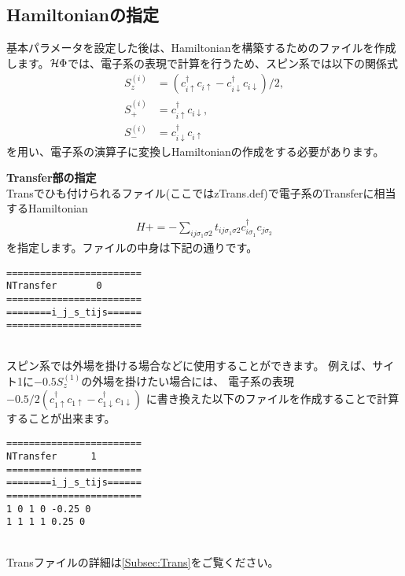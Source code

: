 \subsection{Hamiltonianの指定}
基本パラメータを設定した後は、Hamiltonianを構築するためのファイルを作成します。$\mathcal{H} \Phi$では、電子系の表現で計算を行うため、スピン系では以下の関係式
\begin{align}
S_z^{(i)}&=(c_{i\uparrow}^{\dag}c_{i\uparrow}-c_{i\downarrow}^{\dag}c_{i\downarrow})/2,\\
S_+^{(i)}&=c_{i\uparrow}^{\dag}c_{i\downarrow},\\
S_-^{(i)}&=c_{i\downarrow}^{\dag}c_{i\uparrow}
\end{align}
を用い、電子系の演算子に変換しHamiltonianの作成をする必要があります。
\begin{description}
\item {\bf Transfer部の指定}\\
Transでひも付けられるファイル(ここではzTrans.def)で電子系のTransferに相当するHamiltonian
\begin{align}
H +=-\sum_{ij\sigma_1\sigma2} t_{ij\sigma_1\sigma2}c_{i\sigma_1}^{\dag}c_{j\sigma_2}
\end{align}
を指定します。ファイルの中身は下記の通りです。\\
\begin{minipage}{15cm}
\begin{screen}
\begin{verbatim}
======================== 
NTransfer       0  
======================== 
========i_j_s_tijs====== 
======================== 
\end{verbatim}
\end{screen}
\end{minipage}
~\\
スピン系では外場を掛ける場合などに使用することができます。
例えば、サイト1に$-0.5 S_z^{(1)}$の外場を掛けたい場合には、
電子系の表現$-0.5/2(c_{1\uparrow}^{\dag}c_{1\uparrow}-c_{1\downarrow}^{\dag}c_{1\downarrow})$
に書き換えた以下のファイルを作成することで計算することが出来ます。\\
\begin{minipage}{15cm}
\begin{screen}
\begin{verbatim}
======================== 
NTransfer      1   
======================== 
========i_j_s_tijs====== 
======================== 
1 0 1 0 -0.25 0
1 1 1 1 0.25 0
\end{verbatim}
\end{screen}
\end{minipage}
~\\
Transファイルの詳細は\ref{Subsec:Trans}をご覧ください。


\end{description}
